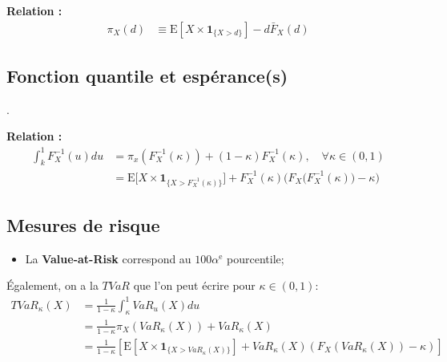 \documentclass[10pt, french]{article}
\begin{document}
\begin{multicols*}{2}
\textbf{Relation :}
\begin{align*}
	\pi_{X}(d)
	&\equiv	\text{E}[X	\times	\bm{1}_{\{X	>	d\}}]	-	d\bar{F}_{X}(d)
\end{align*}


\subsection{Fonction quantile et espérance(s)}
.

\textbf{Relation :}
\begin{align*}
	\int_{k}^{1}F_{X}^{-1}(u)du
	&=	\pi_{x}\left(F_{X}^{-1}(\kappa)\right) + (1 - \kappa)F_{X}^{-1}(\kappa), \quad \forall \kappa \in (0, 1)	\\
	&=	\text{E}\Big[X	\times	\bm{1}_{\{X	>	F_{X}^{-1}(\kappa)\}}\Big]+ 
		F_{X}^{-1}(\kappa)\bigg( F_{X}\Big(F_{X}^{-1}(\kappa)\Big)	-	\kappa \bigg)
\end{align*}

\subsection{Mesures de risque}
\begin{itemize}
	\item	La \textbf{Value-at-Risk} correspond au $100\alpha^{\text{e}}$ pourcentile;
\end{itemize}

Également, on a la $TVaR$ que l'on peut écrire pour $\kappa \in (0, 1)$: 
\begin{align*}
	TVaR_{\kappa}(X)
	&=	\frac{1}{1 - \kappa}\int_{\kappa}^{1}	VaR_{u}(X)du	\\
	&=	\frac{1}{1 - \kappa}\pi_{X}\left(VaR_{\kappa}(X)\right) + VaR_{\kappa}(X)	\\
	&=	\frac{1}{1 - \kappa}\left[	\text{E}[X \times \bm{1}_{\{X	>	VaR_{\kappa}(X)\}}] + VaR_{\kappa}(X) \left(F_{X}\left(VaR_{\kappa}(X)\right)	-	\kappa\right)	\right]
\end{align*}


\end{multicols*}
\end{document}
